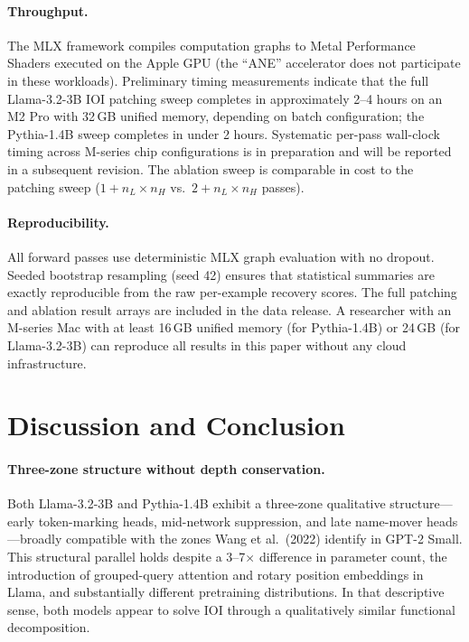 \documentclass[11pt,a4paper]{article}
\begin{document}
\paragraph{Throughput.}
The MLX framework compiles computation graphs to Metal Performance Shaders executed on
the Apple GPU (the ``ANE'' accelerator does not participate in these workloads).
Preliminary timing measurements indicate that the full Llama-3.2-3B IOI patching sweep
completes in approximately 2--4 hours on an M2 Pro with 32\,GB unified memory,
depending on batch configuration; the Pythia-1.4B sweep completes in under 2 hours.
Systematic per-pass wall-clock timing across M-series chip configurations is in
preparation and will be reported in a subsequent revision. The ablation sweep is
comparable in cost to the patching sweep ($1 + n_L \times n_H$ vs.\
$2 + n_L \times n_H$ passes).

\paragraph{Reproducibility.}
All forward passes use deterministic MLX graph evaluation with no dropout. Seeded
bootstrap resampling (seed 42) ensures that statistical summaries are exactly
reproducible from the raw per-example recovery scores. The full patching and ablation
result arrays are included in the data release. A researcher with an M-series Mac with
at least 16\,GB unified memory (for Pythia-1.4B) or 24\,GB (for Llama-3.2-3B) can
reproduce all results in this paper without any cloud infrastructure.

\section{Discussion and Conclusion}
\label{sec:discussion}

\paragraph{Three-zone structure without depth conservation.}
Both Llama-3.2-3B and Pythia-1.4B exhibit a three-zone qualitative structure---early
token-marking heads, mid-network suppression, and late name-mover heads---broadly
compatible with the zones Wang et al.\ (2022) identify in GPT-2 Small. This
structural parallel holds despite a 3--7$\times$ difference in parameter count, the
introduction of grouped-query attention and rotary position embeddings in Llama, and
substantially different pretraining distributions. In that descriptive sense, both
models appear to solve IOI through a qualitatively similar functional decomposition.
\end{document}
